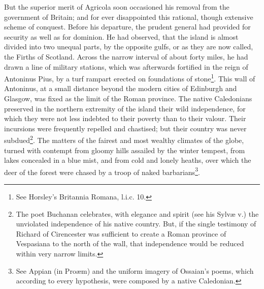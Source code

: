 But the superior merit of Agricola soon occasioned his removal from the government of Britain; and for ever disappointed this rational, though extensive scheme of conquest. Before his departure, the prudent general had provided for security as well as for dominion. He had observed, that the island is almost divided into two unequal parts, by the opposite gulfs, or as they are now called, the Firths of Scotland. Across the narrow interval of about forty miles, he had drawn a line of military stations, which was afterwards fortified in the reign of Antoninus Pius, by a turf rampart erected on foundations of stone\footnote{See Horsley’s Britannia Romana, l.i.c. 10.}. This wall of Antoninus, at a small distance beyond the modern cities of Edinburgh and Glasgow, was fixed as the limit of the Roman province. The native Caledonians preserved in the northern extremity of the island their wild independence, for which they were not less indebted to their poverty than to their valour. Their incursions were frequently repelled and chastised; but their country was never subdued\footnote{The poet Buchanan celebrates, with elegance and spirit (see his Sylvæ
  v.) the unviolated independence of his native country. But, if the single testimony of Richard of Cirencester was sufficient to create a Roman province of Vespasiana to the north of the wall, that independence would be reduced within very narrow limits.}. The matters of the fairest and most wealthy climates of the globe, turned with contempt from gloomy hills assailed by the winter tempest, from lakes concealed in a blue mist, and from cold and lonely heaths, over which the deer of the forest were chased by a troop of naked barbarians\footnote{See Appian (in Proæm) and the uniform imagery of Ossaian’s poems, which according to every hypothesis, were composed by a native Caledonian.}.

